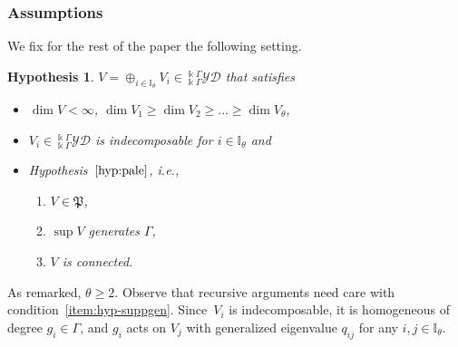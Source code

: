 \documentclass[pdftex]{sigma}
\numberwithin{equation}{section}
\newtheorem{hypothesis}[Theorem]{Hypothesis}
\newcommand{\pale}{\mathfrak{P}}
\newcommand{\I}{{\mathbb I}}
\newcommand{\yd}[1]{{}_{#1}^{#1}\mathcal{YD}}
\begin{document}
\subsubsection{Assumptions} We fix for the rest of the paper the following setting.
\begin{hypothesis}\label{hypo:recargada}
$V = \oplus_{i \in \I_\theta} V_i\in \yd{\Bbbk\Gamma}$
that satisfies
\begin{itemize}\itemsep=0pt
\item $\dim V < \infty$, $\dim V_1 \geq \dim V_2 \geq \dots \geq \dim V_{\theta}$,

\item $V_i \in \yd{\Bbbk \Gamma}$ is indecomposable for $i\in \I_{\theta}$ and

\item Hypothesis~$\ref{hyp:pale}$, i.e.,
\begin{enumerate}[label=\rm{(\Roman*)}]
\item $V \in \pale$,
\item $\sup V$ generates $\Gamma$,
\item $V$ is connected.
\end{enumerate}
\end{itemize}
\end{hypothesis}

As remarked, $\theta \geq 2$.
Observe that recursive arguments need care with condition~\ref{item:hyp-suppgen}.
Since~$V_i$ is indecomposable, it is homogeneous of degree $g_i \in \Gamma$, and $g_i$ acts on $V_j$ with generalized eigenvalue $q_{ij}$
for any $i,j\in \I_{\theta}$.
\end{document}
